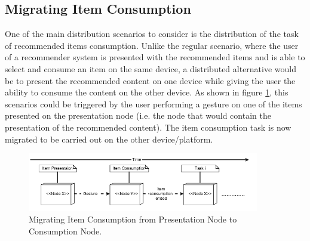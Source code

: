 \subsection{Migrating Item Consumption}
One of the main distribution scenarios to consider is the distribution of the task of recommended items consumption. Unlike the regular scenario, where the user of a recommender system is presented with the recommended items and is able to select and consume an item on the same device, a distributed alternative would be to present the recommended content on one device while giving the user the ability to consume the content on the other device. As shown in figure \ref{fig:figure31}, this scenarios could be triggered by the user performing a gesture on one of the items presented on the presentation node (i.e. the node that would contain the presentation of the recommended content). The item consumption task is now migrated to be carried out on the other device/platform. 
\begin{figure}[h]
\includegraphics[width=0.9\textwidth, inner, center]{generic1}
\caption{Migrating Item Consumption from Presentation Node to Consumption Node.}
\label{fig:figure31}
\end{figure}

